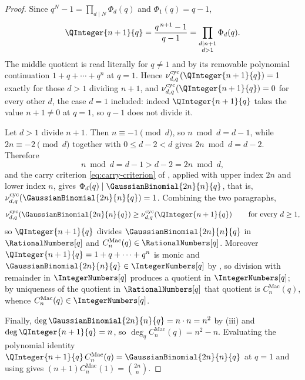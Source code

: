 \documentclass[11pt,a4paper,oneside,openany]{book}
\theoremstyle{definition}
\theoremstyle{remark}
\newcommand{\CyclotomicValuation}[3]{\nu^{\mathrm{cyc}}_{#1,#2}\!\left(#3\right)}
\newcommand{\MacMahonQCatalanPolynomial}[2]{%
  C^{\mathrm{Mac}}_{#1}\!\left(#2\right)}
\begin{document}
\begin{proof}
Since $q^{N}-1=\prod_{d\mid N}\Phi_d(q)$ and $\Phi_1(q)=q-1$,
\[
 \QInteger{n+1}{q}=\frac{q^{\,n+1}-1}{q-1}
 =\prod_{\substack{d\mid n+1\\ d>1}}\Phi_d(q).
\]
The middle quotient is read literally for $q\ne1$ and by its removable
polynomial continuation $1+q+\cdots+q^n$ at $q=1$.
Hence $\CyclotomicValuation{d}{q}{\QInteger{n+1}{q}}=1$ exactly for those $d>1$ dividing $n+1$, and
$\CyclotomicValuation{d}{q}{\QInteger{n+1}{q}}=0$ for every other $d$, the case $d=1$ included: indeed
$\QInteger{n+1}{q}$ takes the value $n+1\ne0$ at $q=1$, so $q-1$ does not divide it.

Let $d>1$ divide $n+1$.  Then $n\equiv-1\pmod d$, so $n\bmod d=d-1$, while
$2n\equiv-2\pmod d$ together with $0\le d-2<d$ gives $2n\bmod d=d-2$.
Therefore
\[
 n\bmod d=d-1>d-2=2n\bmod d,
\]
and the carry criterion \eqref{eq:carry-criterion} of
, applied with upper index $2n$ and lower
index $n$, gives $\Phi_d(q)\mid\GaussianBinomial{2n}{n}{q}$, that is,
$\CyclotomicValuation{d}{q}{\GaussianBinomial{2n}{n}{q}}=1$.  Combining the two paragraphs,
\[
 \CyclotomicValuation{d}{q}{\GaussianBinomial{2n}{n}{q}}
 \ge\CyclotomicValuation{d}{q}{\QInteger{n+1}{q}}
 \qquad\text{for every }d\ge1,
\]
so $\QInteger{n+1}{q}$ divides $\GaussianBinomial{2n}{n}{q}$ in $\RationalNumbers[q]$ and
$\MacMahonQCatalanPolynomial{n}{q}\in\RationalNumbers[q]$.
Moreover $\QInteger{n+1}{q}=1+q+\cdots+q^{n}$ is monic and
$\GaussianBinomial{2n}{n}{q}\in\IntegerNumbers[q]$ by , so division with remainder
in $\IntegerNumbers[q]$ produces a quotient in $\IntegerNumbers[q]$; by uniqueness of the quotient in
$\RationalNumbers[q]$ that quotient is
$\MacMahonQCatalanPolynomial{n}{q}$, whence
$\MacMahonQCatalanPolynomial{n}{q}\in\IntegerNumbers[q]$.

Finally, $\deg\GaussianBinomial{2n}{n}{q}=n\cdot n=n^2$ by
(iii) and $\deg\QInteger{n+1}{q}=n$, so
$\deg_q\MacMahonQCatalanPolynomial{n}{q}=n^2-n$.  Evaluating the polynomial identity
$\QInteger{n+1}{q}\,\MacMahonQCatalanPolynomial{n}{q}
=\GaussianBinomial{2n}{n}{q}$ at $q=1$ and using
 gives
$(n+1)\MacMahonQCatalanPolynomial{n}{1}=\binom{2n}{n}$.
\end{proof}
\end{document}
